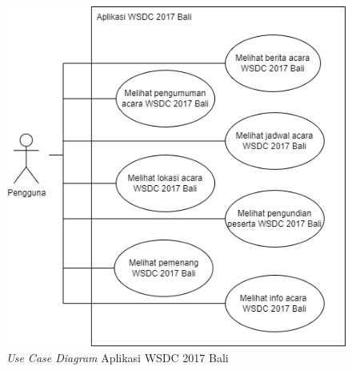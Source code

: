 \begin{figure}[H]
		\centering
	    \includegraphics[scale=0.4]{Gambar/useCaseDiagram.png}
	    \caption{{\it Use Case Diagram} Aplikasi WSDC 2017 Bali}
	    \label{fig:useCaseDiagram}
\end{figure}

